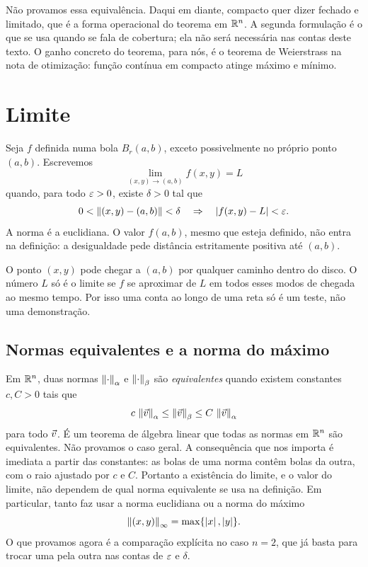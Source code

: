 \documentclass[11pt,a4paper]{article}
\begin{document}
Não provamos essa equivalência. Daqui em diante, compacto quer dizer fechado e limitado, que é a forma operacional do teorema em $\mathbb{R}^n$. A segunda formulação é o que se usa quando se fala de cobertura; ela não será necessária nas contas deste texto. O ganho concreto do teorema, para nós, é o teorema de Weierstrass na nota de otimização: função contínua em compacto atinge máximo e mínimo.

\section{Limite}

\begin{definicao}
Seja $f$ definida numa bola $B_r(a,b)$, exceto possivelmente no próprio ponto $(a,b)$. Escrevemos
\[
\lim_{(x,y)\to(a,b)} f(x,y)=L
\]
quando, para todo $\varepsilon>0$, existe $\delta>0$ tal que
\[
0<\left\lVert (x,y)-(a,b) \right\rVert<\delta\quad\Rightarrow\quad\left\lvert f(x,y)-L \right\rvert<\varepsilon.
\]
A norma é a euclidiana. O valor $f(a,b)$, mesmo que esteja definido, não entra na definição: a desigualdade pede distância estritamente positiva até $(a,b)$.
\end{definicao}

\begin{intuicao}
O ponto $(x,y)$ pode chegar a $(a,b)$ por qualquer caminho dentro do disco. O número $L$ só é o limite se $f$ se aproximar de $L$ em todos esses modos de chegada ao mesmo tempo. Por isso uma conta ao longo de uma reta só é um teste, não uma demonstração.
\end{intuicao}

\subsection{Normas equivalentes e a norma do máximo}

Em $\mathbb{R}^n$, duas normas $\left\lVert \cdot \right\rVert_{\alpha}$ e $\left\lVert \cdot \right\rVert_{\beta}$ são \emph{equivalentes} quando existem constantes $c,C>0$ tais que
\[
c\,\left\lVert \vec{v} \right\rVert_{\alpha}\le\left\lVert \vec{v} \right\rVert_{\beta}\le C\,\left\lVert \vec{v} \right\rVert_{\alpha}
\]
para todo $\vec{v}$. É um teorema de álgebra linear que todas as normas em $\mathbb{R}^n$ são equivalentes. Não provamos o caso geral. A consequência que nos importa é imediata a partir das constantes: as bolas de uma norma contêm bolas da outra, com o raio ajustado por $c$ e $C$. Portanto a existência do limite, e o valor do limite, não dependem de qual norma equivalente se usa na definição. Em particular, tanto faz usar a norma euclidiana ou a norma do máximo
\[
\left\lVert (x,y) \right\rVert_{\infty}=\max\{\left\lvert x \right\rvert,\left\lvert y \right\rvert\}.
\]
O que provamos agora é a comparação explícita no caso $n=2$, que já basta para trocar uma pela outra nas contas de $\varepsilon$ e $\delta$.
\end{document}
